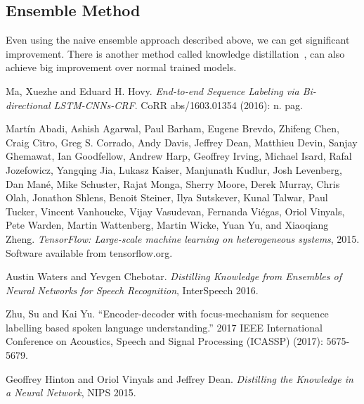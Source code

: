 \documentclass{article}
\begin{document}
\subsection{Ensemble Method}
Even using the naive ensemble approach described above, we can get significant improvement.
There is another method called knowledge distillation~\cite{ts}, can also achieve big improvement over normal trained models.

\begin{thebibliography}{3}
Ma, Xuezhe and Eduard H. Hovy. 
\textit{End-to-end Sequence Labeling via Bi-directional LSTM-CNNs-CRF}. 
CoRR abs/1603.01354 (2016): n. pag.

Martín Abadi, Ashish Agarwal, Paul Barham, Eugene Brevdo,
Zhifeng Chen, Craig Citro, Greg S. Corrado, Andy Davis,
Jeffrey Dean, Matthieu Devin, Sanjay Ghemawat, Ian Goodfellow,
Andrew Harp, Geoffrey Irving, Michael Isard, Rafal Jozefowicz, Yangqing Jia,
Lukasz Kaiser, Manjunath Kudlur, Josh Levenberg, Dan Mané, Mike Schuster,
Rajat Monga, Sherry Moore, Derek Murray, Chris Olah, Jonathon Shlens,
Benoit Steiner, Ilya Sutskever, Kunal Talwar, Paul Tucker,
Vincent Vanhoucke, Vijay Vasudevan, Fernanda Viégas,
Oriol Vinyals, Pete Warden, Martin Wattenberg, Martin Wicke,
Yuan Yu, and Xiaoqiang Zheng.
\textit{TensorFlow: Large-scale machine learning on heterogeneous systems},
2015. Software available from tensorflow.org.

Austin Waters and Yevgen Chebotar. 
\textit{Distilling Knowledge from Ensembles of Neural Networks for Speech Recognition},
InterSpeech 2016.

Zhu, Su and Kai Yu. “Encoder-decoder with focus-mechanism for sequence labelling based spoken language understanding.” 2017 IEEE International Conference on Acoustics, Speech and Signal Processing (ICASSP) (2017): 5675-5679.

Geoffrey Hinton and Oriol Vinyals and Jeffrey Dean.
\textit{Distilling the Knowledge in a Neural Network},
NIPS 2015.

\end{thebibliography}
\end{document}
